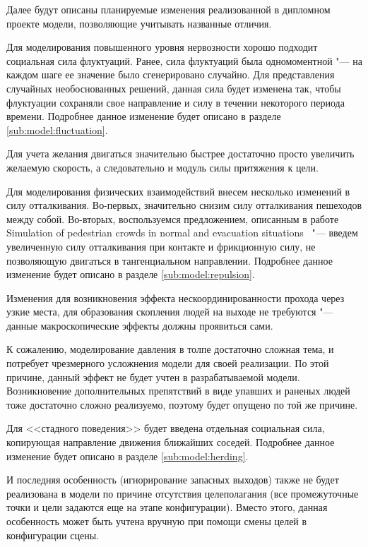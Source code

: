 Далее будут описаны планируемые изменения реализованной в дипломном проекте модели, позволяющие учитывать названные отличия.

Для моделирования повышенного уровня нервозности хорошо подходит социальная сила флуктуаций.
Ранее, сила флуктуаций была одномоментной "--- на каждом шаге ее значение было сгенерировано случайно.
Для представления случайных необоснованных решений, данная сила будет изменена так,
чтобы флуктуации сохраняли свое направление и силу в течении некоторого периода времени.
Подробнее данное изменение будет описано в разделе \ref{sub:model:fluctuation}.

Для учета желания двигаться значительно быстрее достаточно просто увеличить желаемую скорость,
а следовательно и модуль силы притяжения к цели.

Для моделирования физических взаимодействий внесем несколько изменений в силу отталкивания.
Во-первых, значительно снизим силу отталкивания пешеходов между собой.
Во-вторых, воспользуемся предложением, описанным в работе Simulation of pedestrian crowds in normal and evacuation situations~\cite{helbing_evacuation} "---
введем увеличенную силу отталкивания при контакте и фрикционную силу, не позволяющую двигаться в тангенциальном направлении.
Подробнее данное изменение будет описано в разделе \ref{sub:model:repulsion}.

Изменения для возникновения эффекта нескоординированности прохода через узкие места, для образования скопления людей на выходе не требуются "---
данные макроскопические эффекты должны проявиться сами.

К сожалению, моделирование давления в толпе достаточно сложная тема, и потребует чрезмерного усложнения модели для своей реализации.
По этой причине, данный эффект не будет учтен в разрабатываемой модели.
Возникновение дополнительных препятствий в виде упавших и раненых людей тоже достаточно сложно реализуемо, поэтому будет опущено по той же причине.

Для <<стадного поведения>> будет введена отдельная социальная сила, копирующая направление движения ближайших соседей.
Подробнее данное изменение будет описано в разделе \ref{sub:model:herding}.

И последняя особенность (игнорирование запасных выходов) также не будет реализована в модели по причине отсутствия целеполагания
(все промежуточные точки и цели задаются еще на этапе конфигурации).
Вместо этого, данная особенность может быть учтена вручную при помощи смены целей в конфигурации сцены.

